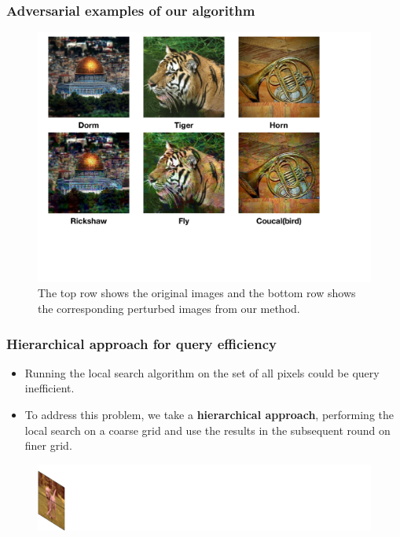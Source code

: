\documentclass[10pt,mathserif]{beamer}
\begin{document}
\begin{frame}
\frametitle{Adversarial examples of our algorithm}
\begin{figure}
\centering
\includegraphics[scale=0.30]{figures/adv_image_examples.pdf}
\caption{The top row shows the original images and the bottom row shows the corresponding perturbed images from our method.}
\label{fig:adv_image_examples}
\end{figure}
\end{frame}

\begin{frame}
    \frametitle{Hierarchical approach for query efficiency}
    \begin{itemize}\itemsep=12pt
        \item Running the local search algorithm on the set of all pixels could be query inefficient.\pause
        \item To address this problem, we take a \textbf{hierarchical approach}, performing the local search on a coarse grid and use the results in the subsequent round on finer grid.
    \end{itemize}\pause
    \begin{figure}
        \centering
        \hspace*{-2.5em}
        \includegraphics[scale=0.35]{figures/hierarchical_1.png}
    \end{figure}
\end{frame}
\end{document}
